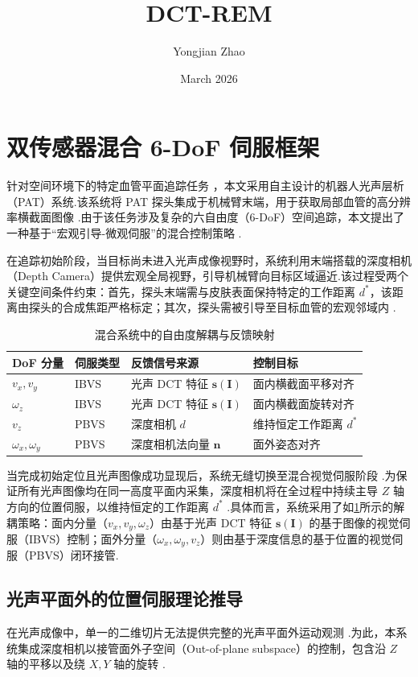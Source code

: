 \documentclass{article}
\title{DCT-REM}
\author{Yongjian Zhao}
\date{March 2026}
\begin{document}
\maketitle
\section{双传感器混合 6-DoF 伺服框架}
\label{sec:6dof_framework}
针对空间环境下的特定血管平面追踪任务 ，本文采用自主设计的机器人光声层析（PAT）系统.该系统将 PAT 探头集成于机械臂末端，用于获取局部血管的高分辨率横截面图像 .由于该任务涉及复杂的六自由度（6-DoF）空间追踪，本文提出了一种基于“宏观引导-微观伺服”的混合控制策略 .

在追踪初始阶段，当目标尚未进入光声成像视野时，系统利用末端搭载的深度相机（Depth Camera）提供宏观全局视野，引导机械臂向目标区域逼近.该过程受两个关键空间条件约束：首先，探头末端需与皮肤表面保持特定的工作距离 $d^*$，该距离由探头的合成焦距严格标定；其次，探头需被引导至目标血管的宏观邻域内 .

\begin{table}[htbp]
    \centering
    \caption{混合系统中的自由度解耦与反馈映射 }
    \label{tab:dof_decoupling}
    \begin{tabularx}{\columnwidth}{XXXX}
        \toprule
        \textbf{DoF 分量} & \textbf{伺服类型} & \textbf{反馈信号来源} & \textbf{控制目标} \\
        \midrule
        $v_x, v_y$ & IBVS & 光声 DCT 特征 $\mathbf{s}(\mathbf{I})$ & 面内横截面平移对齐 \\
        $\omega_z$ & IBVS & 光声 DCT 特征 $\mathbf{s}(\mathbf{I})$ & 面内横截面旋转对齐 \\
        $v_z$ & PBVS & 深度相机 $d$ & 维持恒定工作距离 $d^*$ \\
        $\omega_x, \omega_y$ & PBVS & 深度相机法向量 $\mathbf{n}$ & 面外姿态对齐 \\
        \bottomrule
    \end{tabularx}
\end{table}

当完成初始定位且光声图像成功显现后，系统无缝切换至混合视觉伺服阶段 .为保证所有光声图像均在同一高度平面内采集，深度相机将在全过程中持续主导 $Z$ 轴方向的位置伺服，以维持恒定的工作距离 $d^*$ .具体而言，系统采用了如\cref{tab:dof_decoupling}所示的解耦策略：面内分量（$v_x, v_y, \omega_z$）由基于光声 DCT 特征 $\mathbf{s}(\mathbf{I})$ 的基于图像的视觉伺服（IBVS）控制；面外分量（$\omega_x, \omega_y, v_z$）则由基于深度信息的基于位置的视觉伺服（PBVS）闭环接管.

\subsection{光声平面外的位置伺服理论推导}
\label{sec:out_of_plane}
在光声成像中，单一的二维切片无法提供完整的光声平面外运动观测 .为此，本系统集成深度相机以接管面外子空间（Out-of-plane subspace）的控制，包含沿 $Z$ 轴的平移以及绕 $X, Y$ 轴的旋转 .
\end{document}
